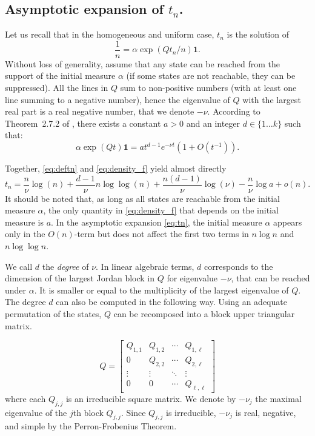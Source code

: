 \documentclass{aptpub}
\begin{document}
\subsection{Asymptotic expansion of $t_n$.}
\label{ssec:spectral}

Let us recall that in the homogeneous and uniform case, $t_n$ is the solution of
\begin{equation*}
  \frac{1}{n} = \alpha\exp(Qt_n/n)\mathbf{1}.
\end{equation*}
Without loss of generality, assume that any state can be reached from
the support of the initial measure $\alpha$ (if some states are not
reachable, they can be suppressed). All the lines in $Q$ sum to
non-positive numbers (with at least one line summing to a negative
number), hence the eigenvalue of $Q$ with the largest real part is a
real negative number, that we denote $-\nu$. According to
Theorem~2.7.2 of \cite[Chapter~2]{latouche1999matrix}, there exists a
constant $a>0$ and an integer $d\in\{1\dots k\}$ such that:
 \begin{equation}
   \alpha\exp(Qt)\mathbf{1} =a t^{d-1} e^{-\nu t}(1+O(t^{-1})).
   \label{eq:density_f}
 \end{equation}
 
Together, \eqref{eq:deftn} and \eqref{eq:density_f}
yield almost directly
\begin{equation}
  t_n = \frac{n}{\nu} \log(n) + \frac{d-1}{\nu} n \log \log(n) 
  + \frac{n(d-1)}{\nu} \log(\nu)
  - \frac{n}{\nu} \log a + o(n).
  \label{eq:tn}
\end{equation}
It should be noted that, as long as all states are reachable from the
initial measure $\alpha$, the only quantity in \eqref{eq:density_f}
that depends on the initial measure is $a$. In the asymptotic
expansion \eqref{eq:tn}, the initial measure $\alpha$ appears only in
the $O(n)$-term but does not affect the first two terms in $n\log n$
and $n \log \log n$. 


We call $d$ the {\it degree} of $\nu$.  In linear algebraic terms, $d$
corresponds to the dimension of the largest Jordan block in $Q$ for
eigenvalue $-\nu$, that can be reached under $\alpha$.  It is smaller
or equal to the multiplicity of the largest eigenvalue of $Q$.  The
degree $d$ can also be computed in the following way.  Using an
adequate permutation of the states, $Q$ can be recomposed into a block
upper triangular matrix.

\begin{equation}
  Q = %
  \begin{bmatrix} Q_{1,1} &  Q_{1,2} & \cdots & Q_{1,\ell} \\ %
    0  & Q_{2,2} & \cdots & Q_{2,\ell} \\ %
    \vdots & \vdots & \ddots & \vdots \\
    0  & 0 & \cdots & Q_{\ell,\ell}
  \end{bmatrix} 
\end{equation}
where each  $Q_{j,j}$ is an irreducible square matrix.
We denote by $-\nu_j$ the maximal eigenvalue of the $j$th  block 
$Q_{j,j}$. Since $Q_{j,j}$ is irreducible, $-\nu_j$ is real, negative, and simple
by the Perron-Frobenius Theorem.
\end{document}
